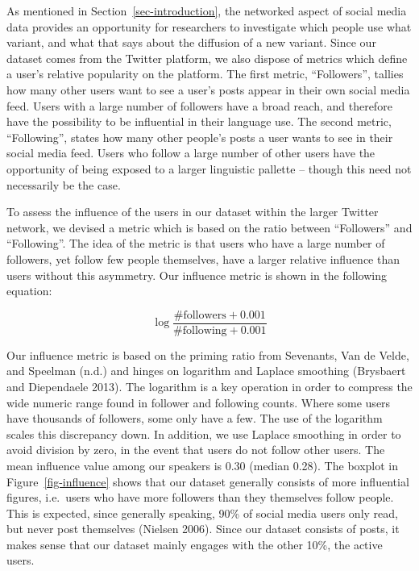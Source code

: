\documentclass[
  letterpaper,
  DIV=11,
  numbers=noendperiod,
  oneside]{scrartcl}
\begin{document}
As mentioned in Section~\ref{sec-introduction}, the networked aspect of
social media data provides an opportunity for researchers to investigate
which people use what variant, and what that says about the diffusion of
a new variant. Since our dataset comes from the Twitter platform, we
also dispose of metrics which define a user's relative popularity on the
platform. The first metric, ``Followers'', tallies how many other users
want to see a user's posts appear in their own social media feed. Users
with a large number of followers have a broad reach, and therefore have
the possibility to be influential in their language use. The second
metric, ``Following'', states how many other people's posts a user wants
to see in their social media feed. Users who follow a large number of
other users have the opportunity of being exposed to a larger linguistic
pallette -- though this need not necessarily be the case.

To assess the influence of the users in our dataset within the larger
Twitter network, we devised a metric which is based on the ratio between
``Followers'' and ``Following''. The idea of the metric is that users
who have a large number of followers, yet follow few people themselves,
have a larger relative influence than users without this asymmetry. Our
influence metric is shown in the following equation:

\[
\log{
  \frac{
    \text{\# followers} + 0.001
  } {
    \text{\# following} + 0.001
  }
}
\]

Our influence metric is based on the priming ratio from Sevenants, Van
de Velde, and Speelman (n.d.) and hinges on logarithm and Laplace
smoothing (Brysbaert and Diependaele 2013). The logarithm is a key
operation in order to compress the wide numeric range found in follower
and following counts. Where some users have thousands of followers, some
only have a few. The use of the logarithm scales this discrepancy down.
In addition, we use Laplace smoothing in order to avoid division by
zero, in the event that users do not follow other users. The mean
influence value among our speakers is 0.30 (median 0.28). The boxplot in
Figure~\ref{fig-influence} shows that our dataset generally consists of
more influential figures, i.e.~users who have more followers than they
themselves follow people. This is expected, since generally speaking,
90\% of social media users only read, but never post themselves (Nielsen
2006). Since our dataset consists of posts, it makes sense that our
dataset mainly engages with the other 10\%, the active users.
\end{document}
